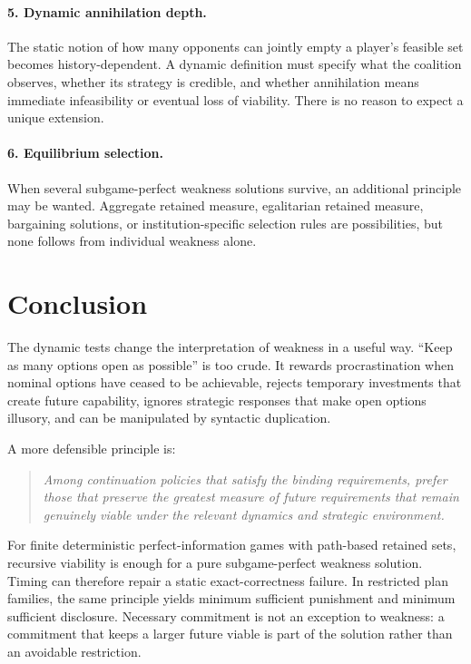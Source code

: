 \documentclass[11pt]{article}
\theoremstyle{definition}
\begin{document}
\paragraph{5. Dynamic annihilation depth.}
The static notion of how many opponents can jointly empty a player's feasible set becomes history-dependent. A dynamic definition must specify what the coalition observes, whether its strategy is credible, and whether annihilation means immediate infeasibility or eventual loss of viability. There is no reason to expect a unique extension.

\paragraph{6. Equilibrium selection.}
When several subgame-perfect weakness solutions survive, an additional principle may be wanted. Aggregate retained measure, egalitarian retained measure, bargaining solutions, or institution-specific selection rules are possibilities, but none follows from individual weakness alone.

\section{Conclusion}

The dynamic tests change the interpretation of weakness in a useful way. ``Keep as many options open as possible'' is too crude. It rewards procrastination when nominal options have ceased to be achievable, rejects temporary investments that create future capability, ignores strategic responses that make open options illusory, and can be manipulated by syntactic duplication.

A more defensible principle is:
\begin{quote}
\emph{Among continuation policies that satisfy the binding requirements, prefer those that preserve the greatest measure of future requirements that remain genuinely viable under the relevant dynamics and strategic environment.}
\end{quote}

For finite deterministic perfect-information games with path-based retained sets, recursive viability is enough for a pure subgame-perfect weakness solution. Timing can therefore repair a static exact-correctness failure. In restricted plan families, the same principle yields minimum sufficient punishment and minimum sufficient disclosure. Necessary commitment is not an exception to weakness: a commitment that keeps a larger future viable is part of the solution rather than an avoidable restriction.
\end{document}
